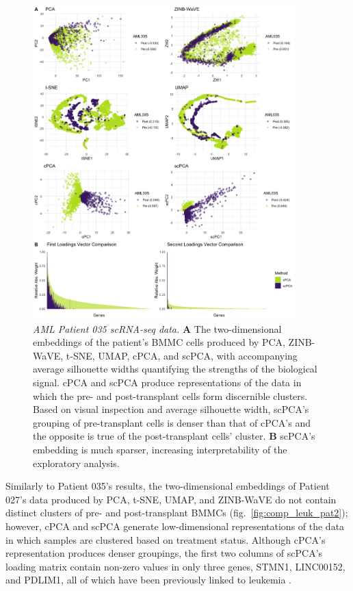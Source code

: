 \begin{figure}[!htbp]
  \centering
  \includegraphics[width=0.9\textwidth]{figures/aml035_results}
  \caption{{\em AML Patient 035 scRNA-seq data.} 
  \textbf{A} The two-dimensional embeddings of the patient's BMMC cells produced by PCA, ZINB-WaVE, t-SNE, UMAP, cPCA, and scPCA, with accompanying average silhouette widths quantifying the strengths of the biological signal. cPCA and scPCA produce representations of the data in which the pre- and post-transplant cells form discernible clusters. Based on visual inspection and average silhouette width, scPCA's grouping of pre-transplant cells is denser than that of cPCA's and the opposite is true of the post-transplant cells' cluster. \textbf{B} scPCA's embedding is much sparser, increasing interpretability of the exploratory analysis.}
  \label{fig:comp_leuk_pat1}
\end{figure}

Similarly to Patient 035's results, the two-dimensional embeddings of Patient 027's data produced by PCA, t-SNE, UMAP, and ZINB-WaVE do not contain distinct clusters of pre- and post-transplant BMMCs (fig.~\ref{fig:comp_leuk_pat2}); however, cPCA and scPCA generate low-dimensional representations of the data in which samples are clustered based on treatment status. Although cPCA's representation produces denser groupings, the first two columns of scPCA's loading matrix contain non-zero values in only three genes, STMN1, LINC00152, and PDLIM1, all of which have been previously linked to leukemia \cite{Machado-Neto2014,Zhang2019,Holleman2004}. 
\FloatBarrier